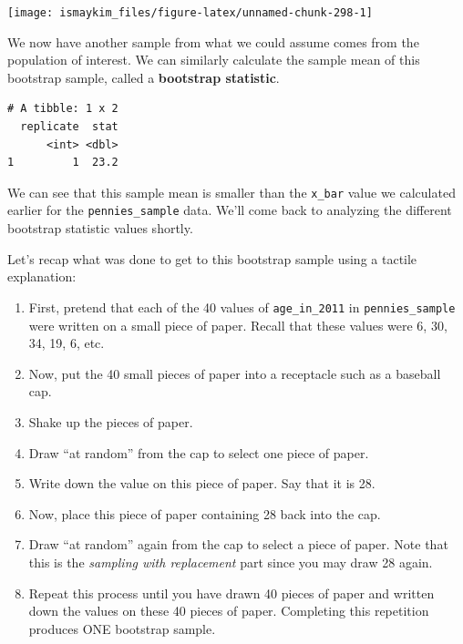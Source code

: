 \documentclass[12pt,]{krantz}
\makeatletter
\newenvironment{Shaded}{\begin{snugshade}}{\end{snugshade}}
\newcommand{\KeywordTok}[1]{\textcolor[rgb]{0.27,0.27,0.27}{\textbf{#1}}}
\newcommand{\DataTypeTok}[1]{\textcolor[rgb]{0.27,0.27,0.27}{#1}}
\newcommand{\DecValTok}[1]{\textcolor[rgb]{0.06,0.06,0.06}{#1}}
\newcommand{\StringTok}[1]{\textcolor[rgb]{0.5,0.5,0.5}{#1}}
\newcommand{\OperatorTok}[1]{\textcolor[rgb]{0.43,0.43,0.43}{\textbf{#1}}}
\newcommand{\NormalTok}[1]{#1}
\providecommand{\tightlist}{%
  \setlength{\itemsep}{0pt}\setlength{\parskip}{0pt}}
\newenvironment{kframe}{%
\medskip{}
\setlength{\fboxsep}{.8em}
 \def\at@end@of@kframe{}%
 \ifinner\ifhmode%
  \def\at@end@of@kframe{\end{minipage}}%
  \begin{minipage}{\columnwidth}%
 \fi\fi%
 \def\FrameCommand##1{\hskip\@totalleftmargin \hskip-\fboxsep
 \colorbox{shadecolor}{##1}\hskip-\fboxsep
     \hskip-\linewidth \hskip-\@totalleftmargin \hskip\columnwidth}%
 \MakeFramed {\advance\hsize-\width
   \@totalleftmargin\z@ \linewidth\hsize
   \@setminipage}}%
 {\par\unskip\endMakeFramed%
 \at@end@of@kframe}
\renewenvironment{Shaded}{\begin{kframe}}{\end{kframe}}
\theoremstyle{definition}
\theoremstyle{definition}
\theoremstyle{definition}
\theoremstyle{remark}
\makeatother
\begin{document}
\begin{center}\texttt{[image: ismaykim\_files/figure-latex/unnamed-chunk-298-1]} \end{center}

We now have another sample from what we could assume comes from the
population of interest. We can similarly calculate the sample mean of
this bootstrap sample, called a \textbf{bootstrap statistic}.

\begin{Shaded}
\end{Shaded}

\begin{verbatim}
# A tibble: 1 x 2
  replicate  stat
      <int> <dbl>
1         1  23.2
\end{verbatim}

We can see that this sample mean is smaller than the \texttt{x\_bar}
value we calculated earlier for the \texttt{pennies\_sample} data. We'll
come back to analyzing the different bootstrap statistic values shortly.

Let's recap what was done to get to this bootstrap sample using a
tactile explanation:

\begin{enumerate}
\def\labelenumi{\arabic{enumi}.}
\tightlist
\item
  First, pretend that each of the 40 values of \texttt{age\_in\_2011} in
  \texttt{pennies\_sample} were written on a small piece of paper.
  Recall that these values were 6, 30, 34, 19, 6, etc.
\item
  Now, put the 40 small pieces of paper into a receptacle such as a
  baseball cap.
\item
  Shake up the pieces of paper.
\item
  Draw ``at random'' from the cap to select one piece of paper.
\item
  Write down the value on this piece of paper. Say that it is 28.
\item
  Now, place this piece of paper containing 28 back into the cap.
\item
  Draw ``at random'' again from the cap to select a piece of paper. Note
  that this is the \emph{sampling with replacement} part since you may
  draw 28 again.
\item
  Repeat this process until you have drawn 40 pieces of paper and
  written down the values on these 40 pieces of paper. Completing this
  repetition produces ONE bootstrap sample.
\end{enumerate}
\end{document}
